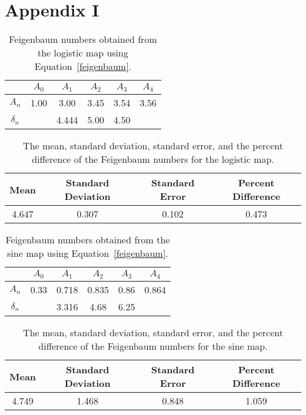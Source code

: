 \documentclass[12pt]{report}
\theoremstyle{definition}
\begin{document}
\section*{Appendix I }
%
%

\begin{table}[htbp]
\caption{Feigenbaum numbers obtained from the logistic map using Equation~\ref{feigenbaum}.}
\centering
\begin{tabular}{|c|c|c|c|c|c|}
\hline
 & $A_0$ & \multicolumn{1}{c|}{$A_1$} & \multicolumn{1}{c|}{$A_2$} & \multicolumn{1}{c|}{$A_3$} & $A_4$ \\ \hline
$A_n$ & \multicolumn{1}{r|}{1.00} & 3.00 & 3.45 & 3.54 & \multicolumn{1}{r|}{3.56} \\ \hline
$\delta_n$ &  & 4.444 & 5.00 & 4.50 &  \\ \hline
\end{tabular}
\label{feigenbaumlogistic}
\end{table}

\begin{table}[htbp]
\centering
\caption{The mean, standard deviation, standard error, and the percent difference of the Feigenbaum numbers for the logistic map.}
\begin{tabular}{|c|c|c|c|}
\hline
Mean & Standard Deviation & Standard Error & Percent Difference \\ \hline
\multicolumn{1}{|c|}{4.647} & \multicolumn{1}{c|}{0.307} & \multicolumn{1}{c|}{0.102} & \multicolumn{1}{c|}{0.473} \\ \hline
\end{tabular}
\label{stdevfeigen}
\end{table}

\begin{table}[htbp]
\caption{Feigenbaum numbers obtained from the sine map using Equation~\ref{feigenbaum}.}
\centering
\begin{tabular}{|c|c|c|c|c|c|}
\hline
 & $A_0$ & \multicolumn{1}{c|}{$A_1$} & \multicolumn{1}{c|}{$A_2$} & \multicolumn{1}{c|}{$A_3$} & $A_4$ \\ \hline
$A_n$ & \multicolumn{1}{r|}{0.33} & 0.718 & 0.835 & 0.86 & \multicolumn{1}{r|}{0.864} \\ \hline
$\delta_n$ &  & 3.316 & 4.68 & 6.25 &  \\ \hline
\end{tabular}
\label{feigenbaumsine}
\end{table}

\begin{table}[htbp]
\centering
\caption{The mean, standard deviation, standard error, and the percent difference of the Feigenbaum numbers for the sine map.}
\begin{tabular}{|c|c|c|c|}
\hline
Mean & Standard Deviation & Standard Error & Percent Difference \\ \hline
\multicolumn{1}{|c|}{4.749} & \multicolumn{1}{c|}{1.468} & \multicolumn{1}{c|}{0.848} & \multicolumn{1}{c|}{1.059} \\ \hline
\end{tabular}
\label{stdevfeigensine}
\end{table}
\end{document}
